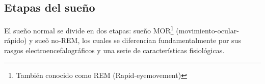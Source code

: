 

\subsection{Etapas del sue\~no}

El sue\~no normal se divide en dos etapas: sue\~no  MOR\footnote{Tambi\'en conocido como
REM (Rapid-eyemovement)} (movimiento-ocular-r\'apido) y sue\~o no-REM, los cuales se diferencian 
fundamentalmente por sus rasgos electroencefalogr\'aficos y una serie de caracter\'isticas 
fisiol\'ogicas\cite{AASM07}.


